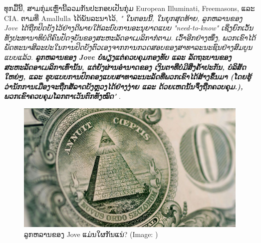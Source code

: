 \documentclass[10pt,twocolumn,letterpaper]{article}
\begin{document}
ທຸກມື້ນີ້, ສາມກຸ່ມເຫຼົ່ານີ້ລວມກັນປະກອບເປັນກຸ່ມ European Illuminati, Freemasons, ແລະ CIA. 
ຕາມທີ່ Amallulla ໄດ້ພັນລະນາໄວ້, \textit{" ໃນຕອນນີ້, ໃນຍຸກສຸດທ້າຍ, ລູກຫລານຂອງ Jove ໄດ້ຖືກປິດບັງໄວ້ຢ່າງດີພາຍໃຕ້ລະບົບການອະນຸຍາດແບບ "need-to-know" ເຊິ່ງຍົກເວັ້ນທັງປະທານາທິບໍດີຄົນປັດຈຸບັນຂອງສະຫະລັດອາເມລິກາກໍຕາມ. ເວົ້າອີກຢ່າງໜຶ່ງ, ພວກເຂົາໄດ້ພັດທະນາສິລະປະໃນການປິດບັງຕົວເອງຈາກການກວດສອບຂອງສາທາລະນະຊົນຢ່າງສົມບູນແບບແລ້ວ. \textbf{ລູກຫລານຂອງ Jove ບໍ່ພຽງແຕ່ຄວບຄຸມກອງທັບ ແລະ ລັດຖະບານຂອງສະຫະລັດອາເມລິກາເທົ່ານັ້ນ, ແຕ່ຍັງຜ່ານອຳນາດຂອງ ເງິນຕາທີ່ບໍ່ມີສິ່ງຄໍ້າປະກັນ, ບໍລິສັດໃຫຍ່ໆ, ແລະ ຮູບແບບການປົກຄອງແບບສາທາລະນະລັດທີ່ພວກເຂົາໄດ້ສ້າງຂຶ້ນມາ (ໂດຍຮູ້ວ່ານັກການເມືອງຈະຖືກສໍ້ລາດບັງຫຼວງໄດ້ຢ່າງງ່າຍ ແລະ ດ້ວຍເຫດນັ້ນຈຶ່ງຖືກຄວບຄຸມ.), ພວກເຂົາຄວບຄຸມໂລກຕາເວັນຕົກທັງໝົດ}"} \cite{33,34}. 
\begin{figure}[t]
\begin{center}
   \includegraphics[width=1\linewidth]{illuminati.jpg}
\end{center}
   \caption{ລູກຫລານຂອງ Jove ແມ່ນໃຜກັນແນ່?
(Image: \cite{35})}
\label{fig:10}
\label{fig:onecol}
\end{figure}
\end{document}
